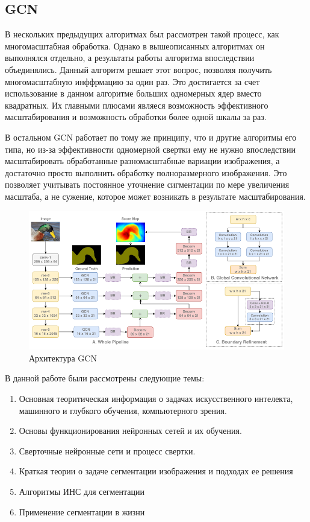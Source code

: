 \documentclass[bachelor, och, coursework]{shiza}
\begin{document}
\subsection{GCN}

В нескольких предыдущих алгоритмах был рассмотрен такой процесс, как многомасштабная обработка. Однако в вышеописанных алгоритмах он выполнялся отдельно, а
результаты работы алгоритма впоследствии объединялись. Данный алгоритм решает этот вопрос, позволяя получить многомасштабную инффрмацию за один раз. Это
достигается за счет использование в данном алгоритме больших одномерных ядер вместо квадратных. Их главными плюсами являеся возможность эффективного масштабирования
и возможность обработки более одной шкалы за раз.

В остальном GCN работает по тому же принципу, что и другие алгоритмы его типа, но из-за эффективности одномерной свертки ему не нужно впоследствии масштабировать
обработанные разномасштабные вариации изображения, а достаточно просто выполнить обработку полноразмерного изображения. Это позволяет учитывать постоянное уточнение
сигментации по мере увеличения масштаба, а не сужение, которое может возникать в результате масштабирования.
\begin{figure}[H]
    \centering
    \includegraphics[width=1\textwidth]{14}
    \caption{Архитектура GCN}
    \label{fig:img1}
\end{figure}


\newpage
\conclusion %

В данной работе были рассмотрены следующие темы:

\begin{enumerate}
    \item Основная теоритическая информация о задачах искусственного интелекта, машинного и глубкого обучения, компьютерного зрения.
    \item Основы функционирования нейронных сетей и их обучения.
    \item Сверточные нейронные сети и процесс свертки.
    \item Краткая теории о задаче сегментации изображения и подходах ее решения
    \item Алгоритмы ИНС для сегментации
    \item Применение сегментации в жизни
\end{enumerate}
\end{document}
